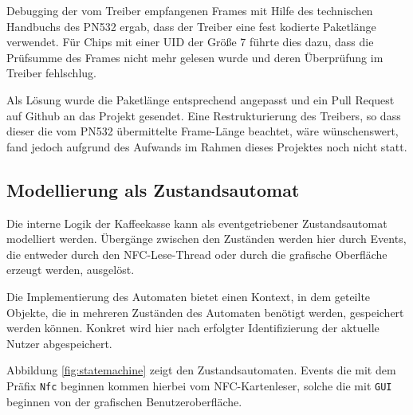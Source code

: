 \documentclass[11pt,a4paper]{IEEEtran} \usepackage[ngerman]{babel}
\begin{document}
Debugging der vom Treiber empfangenen Frames mit Hilfe des technischen Handbuchs
des PN532 ergab, dass der Treiber eine fest kodierte Paketlänge verwendet. Für
Chips mit einer UID der Größe \SI{7}{\byte} führte dies dazu, dass die 
Prüfsumme des Frames nicht mehr gelesen wurde und deren Überprüfung im Treiber
fehlschlug.

Als Lösung wurde die Paketlänge entsprechend angepasst und ein Pull Request auf
Github an das Projekt gesendet\autocite{AdafruitPullRequest}. Eine
Restrukturierung des Treibers, so dass dieser die vom PN532 übermittelte 
Frame-Länge beachtet, wäre wünschenswert, fand jedoch aufgrund des Aufwands
im Rahmen dieses Projektes noch nicht statt.

\subsection{Modellierung als Zustandsautomat}

\begin{figure*}[ht!]
    \centering
    
    \caption{Darstellung der internen Logik des Programms als Zustandsautomat.}
    \label{fig:statemachine}
\end{figure*}

Die interne Logik der Kaffeekasse kann als eventgetriebener Zustandsautomat 
modelliert werden. Übergänge zwischen den Zuständen werden hier durch Events,
die entweder durch den NFC-Lese-Thread oder durch die grafische Oberfläche
erzeugt werden, ausgelöst. 

Die Implementierung des Automaten bietet einen Kontext, in dem geteilte
Objekte, die in mehreren Zuständen des Automaten benötigt werden, gespeichert 
werden können. Konkret wird hier nach erfolgter Identifizierung der aktuelle
Nutzer abgespeichert.

Abbildung \ref{fig:statemachine} zeigt den Zustandsautomaten. Events die
mit dem Präfix \texttt{Nfc} beginnen kommen hierbei vom NFC-Kartenleser, solche
die mit \texttt{GUI} beginnen von der grafischen Benutzeroberfläche. 
\end{document}
